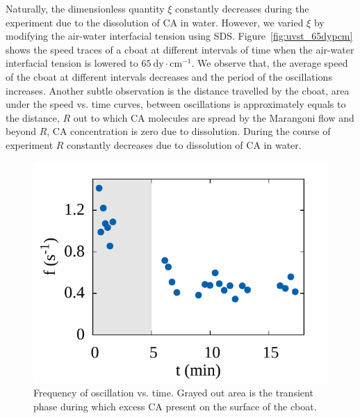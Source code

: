 \documentclass[journal=langd5, manuscript=article, layout=twocolumn]{achemso}
\begin{document}
Naturally, the dimensionless quantity $\xi$ constantly decreases during the experiment due to the dissolution of CA in water. However, we varied $\xi$ by modifying the air-water interfacial tension using SDS. Figure~\ref{fig:uvst_65dypcm} shows the speed traces of a cboat at different intervals of time when the air-water interfacial tension is lowered to $65\ \mathrm{dy\cdot cm^{-1}}$. We observe that, the average speed of the cboat at different intervals decreases and the period of the oscillations increases. Another subtle observation is the distance travelled by the cboat, area under the speed vs. time curves, between oscillations is approximately equals to the distance, $R$ out to which CA molecules are spread by the Marangoni flow and beyond $R$, CA concentration is zero due to dissolution. During the course of experiment $R$ constantly decreases due to dissolution of CA in water. 
\begin{figure}[ht] 
    \centering
       \includegraphics[width=\linewidth]{freqvst.pdf}
    \caption{Frequency of oscillation vs. time. Grayed out area is the transient phase during which excess CA present on the surface of the cboat.}
    \label{fig:freqvst}
\end{figure}
\end{document}

